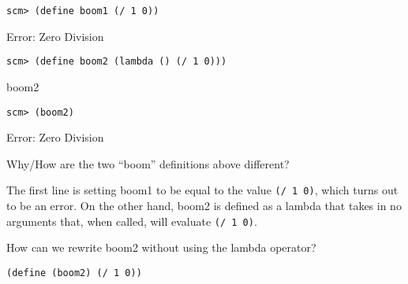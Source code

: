 \begin{blocksection}
\begin{lstlisting}
scm> (define boom1 (/ 1 0))
\end{lstlisting}
\begin{solution}[0.25in]
Error: Zero Division
\end{solution}

\begin{lstlisting}
scm> (define boom2 (lambda () (/ 1 0)))
\end{lstlisting}
\begin{solution}[0.25in]
boom2
\end{solution}

\begin{lstlisting}
scm> (boom2)
\end{lstlisting}
\begin{solution}[0.25in]
Error: Zero Division
\end{solution}
\end{blocksection}

\begin{blocksection}
Why/How are the two ``boom'' definitions above different?
\begin{solution}[1in]
The first line is setting boom1 to be equal to the value \texttt{(/ 1 0)}, which
turns out to be an error. On the other hand, boom2 is defined as a lambda that
takes in no arguments that, when called, will evaluate \texttt{(/ 1 0)}.
\end{solution}

How can we rewrite boom2 without using the lambda operator?
\begin{solution}[0.5in]
\begin{lstlisting}
(define (boom2) (/ 1 0))
\end{lstlisting}
\end{solution}
\end{blocksection}
